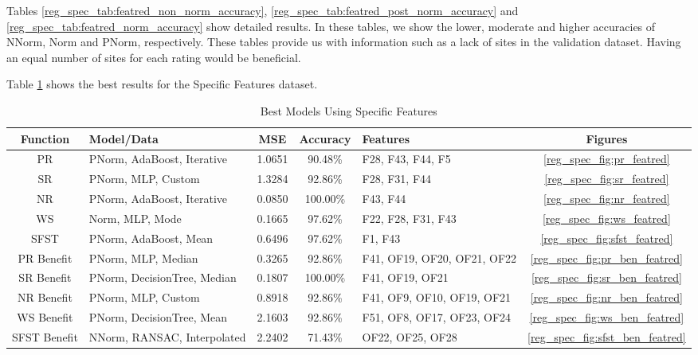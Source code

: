 \documentclass[12pt,letterpaper]{article}
\begin{document}
Tables \ref{reg_spec_tab:featred_non_norm_accuracy}, \ref{reg_spec_tab:featred_post_norm_accuracy} and \ref{reg_spec_tab:featred_norm_accuracy} show detailed results.
In these tables, we show the lower, moderate and higher accuracies of \ac{NNorm}, \ac{Norm} and \ac{PNorm}, respectively.
These tables provide us with information such as a lack of sites in the validation dataset.
Having an equal number of sites for each rating would be beneficial.

Table \ref{reg_spec_tab:best} shows the best results for the Specific Features dataset.

\begin{table}[H]
\centering
\begin{tabular}{|c|p{3cm}|c|c|p{3cm}|c|}
\hline
\textbf{Function} & \textbf{Model/Data} & \textbf{MSE} & \textbf{Accuracy} & \textbf{Features} & \textbf{Figures}  \\
\hline
 PR & \ac{PNorm}, AdaBoost, Iterative & 1.0651 & 90.48\% & F28, F43, F44, F5 &\ref{reg_spec_fig:pr_featred} \\
\hline
 SR & \ac{PNorm}, MLP, Custom & 1.3284 & 92.86\% & F28, F31, F44 & \ref{reg_spec_fig:sr_featred} \\
\hline
 NR & \ac{PNorm}, AdaBoost, Iterative & 0.0850 & 100.00\% & F43, F44 & \ref{reg_spec_fig:nr_featred} \\
\hline
 WS & Norm, MLP, Mode & 0.1665 & 97.62\% & F22, F28, F31, F43 & \ref{reg_spec_fig:ws_featred}\\
\hline
 SFST & \ac{PNorm}, AdaBoost, Mean & 0.6496 & 97.62\% & F1, F43 & \ref{reg_spec_fig:sfst_featred}\\
\hline
 PR Benefit & \ac{PNorm}, MLP, Median & 0.3265 & 92.86\% & F41, OF19, OF20, OF21, OF22 & \ref{reg_spec_fig:pr_ben_featred}\\
\hline
SR Benefit & \ac{PNorm}, DecisionTree, Median & 0.1807 & 100.00\% & F41, OF19, OF21 & \ref{reg_spec_fig:sr_ben_featred}\\
\hline
 NR Benefit & \ac{PNorm}, MLP, Custom & 0.8918 & 92.86\% & F41, OF9, OF10, OF19, OF21 & \ref{reg_spec_fig:nr_ben_featred}\\
\hline
 WS Benefit & \ac{PNorm}, DecisionTree, Mean & 2.1603 & 92.86\% & F51, OF8, OF17, OF23, OF24 & \ref{reg_spec_fig:ws_ben_featred}\\
\hline
 SFST Benefit & \ac{NNorm}, RANSAC, Interpolated & 2.2402 & 71.43\% & OF22, OF25, OF28 & \ref{reg_spec_fig:sfst_ben_featred} \\
\hline
\end{tabular}
\caption{Best Models Using Specific Features}
\label{reg_spec_tab:best}
\end{table}
\end{document}
